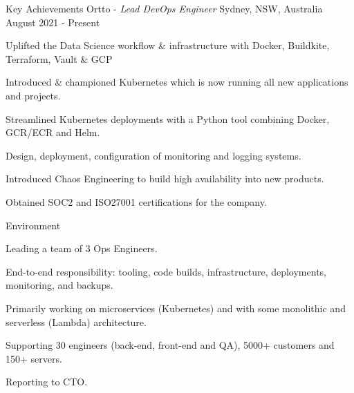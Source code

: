 

\begin{cventries}

  \cventry
  {Key Achievements} %
  {Ortto - \emph{Lead DevOps Engineer}} %
  {Sydney, NSW, Australia} %
  {August 2021  - Present} %
  {
    \begin{cvitems} %
      \item {Uplifted the Data Science workflow \& infrastructure with Docker, Buildkite, Terraform, Vault \& GCP}
      \item {Introduced \& championed Kubernetes which is now running all new applications and projects.}
      \item {Streamlined Kubernetes deployments with a Python tool combining Docker, GCR/ECR and Helm.}
      \item {Design, deployment, configuration of monitoring and logging systems.}
      \item {Introduced Chaos Engineering to build high availability into new products.}
      \item {Obtained SOC2 and ISO27001 certifications for the company.}
    \end{cvitems}
  }

  \cventry
  {Environment} %
  {} %
  {} %
  {} %
  {
    \begin{cvitems} %
      \item {Leading a team of 3 Ops Engineers.}
      \item {End-to-end responsibility: tooling, code builds, infrastructure, deployments, monitoring, and backups.}
      \item {Primarily working on microservices (Kubernetes) and with some monolithic and serverless (Lambda) architecture.}
      \item {Supporting 30 engineers (back-end, front-end and QA), 5000+ customers and 150+ servers.}
      \item {Reporting to CTO.}
    \end{cvitems}
  }


\end{cventries}
